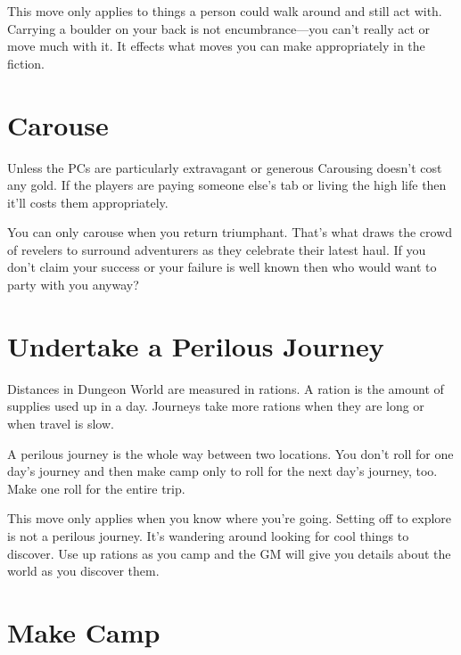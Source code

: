        

This move only applies to things a person could walk around and still act with. Carrying a boulder on your back is not encumbrance—you can't really act or move much with it. It effects what moves you can make appropriately in the fiction.

       
\section{Carouse}   
       

Unless the PCs are particularly extravagant or generous Carousing doesn't cost any gold. If the players are paying someone else's tab or living the high life then it'll costs them appropriately.

       

You can only carouse when you return triumphant. That's what draws the crowd of revelers to surround adventurers as they celebrate their latest haul. If you don't claim your success or your failure is well known then who would want to party with you anyway?

       
\section{Undertake a Perilous Journey}     
       

Distances in Dungeon World are measured in rations. A ration is the amount of supplies used up in a day. Journeys take more rations when they are long or when travel is slow.

       

A perilous journey is the whole way between two locations. You don't roll for one day's journey and then make camp only to roll for the next day's journey, too. Make one roll for the entire trip.

       

This move only applies when you know where you're going. Setting off to explore is not a perilous journey. It's wandering around looking for cool things to discover. Use up rations as you camp and the GM will give you details about the world as you discover them.

       
\section{Make Camp}   
       

